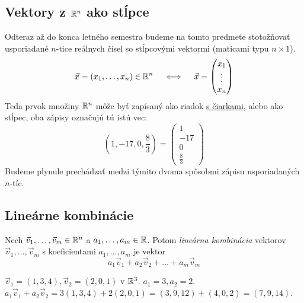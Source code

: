 \subsection{Vektory z $\mathbb{R}^n$ ako stĺpce}
Odteraz až do konca letného semestra budeme na tomto predmete stotožňovať
usporiadané $n$-tice reálnych čísel so stĺpcovými vektormi (maticami typu $n \times 1$).
$$ \vec{x} = (x_1, \dots, x_n) \in \mathbb{R}^n \quad \iff \quad \vec{x} = \begin{pmatrix} x_1 \\ \vdots \\ x_n \end{pmatrix} $$
Teda prvok množiny $\mathbb{R}^n$ môže byť zapísaný ako riadok \underline{s čiarkami}, alebo
ako stĺpec, oba zápisy označujú tú istú vec:
\[
(1,-17,0,\frac{8}{3})=
\begin{pmatrix}
1\\-17\\0\\\frac{8}{3}
\end{pmatrix}
\]
Budeme plynule prechádzať medzi týmito dvoma spôsobmi zápisu usporiadaných $n$-tíc.


\subsection{Lineárne kombinácie}
\begin{definition}
Nech $\vec{v}_1, \dots, \vec{v}_m \in \mathbb{R}^n$ a $a_1, \dots, a_m \in \mathbb{R}$.
Potom \emph{lineárna kombinácia} vektorov $\vec{v}_1, \dots, \vec{v}_m$ s koeficientami $a_1, \dots, a_m$ je vektor
$$ a_1\vec{v}_1 + a_2\vec{v}_2 + \dots + a_m\vec{v}_m $$
\end{definition}

\begin{example}
$\vec{v}_1 = (1,3,4), \vec{v}_2 = (2,0,1)$ v $\mathbb{R}^3$.
$a_1 = 3, a_2 = 2$.
$a_1\vec{v}_1 + a_2\vec{v}_2 = 3(1,3,4) + 2(2,0,1) = (3,9,12) + (4,0,2) = (7,9,14)$.
\end{example}

